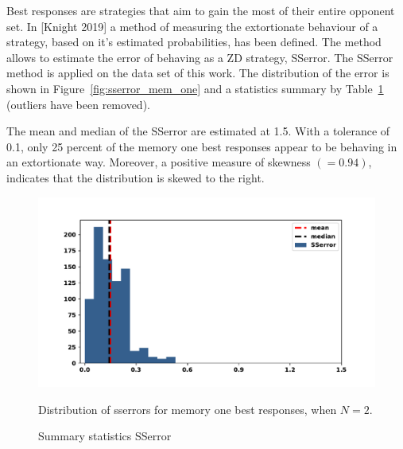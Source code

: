 \documentclass[10pt]{article}
\begin{document}
Best responses are strategies that aim to gain the most of their entire opponent
set. In [Knight 2019] a method of measuring the extortionate behaviour of a
strategy, based on it's estimated probabilities, has been defined. The method
allows to estimate the error of behaving as a ZD strategy, SSerror. The SSerror
method is applied on the data set of this work. The distribution of the error is
shown in Figure~\ref{fig:sserror_mem_one} and a statistics summary by
Table~\ref{table:sserror_stats} (outliers have been removed).

The mean and median of the SSerror are estimated at 1.5. With a tolerance of 0.1,
only 25 percent of the memory one best responses appear to be behaving in an
extortionate way. Moreover, a positive measure of skewness \((=0.94)\), indicates
that the distribution is skewed to the right. 

\begin{figure}
    \begin{minipage}{0.59\textwidth}
            \begin{center}
            \includegraphics[width=\linewidth]{img/best_respones_sserror_remove_outliers.pdf}
            \end{center}
            \caption{Distribution of sserrors for memory one best responses, when \(N=2\).}
            \label{fig:sserror_mem_one}
    \end{minipage}
    \hfill
    \begin{minipage}{0.39\textwidth}
        \centering
        \captionsetup{type=table}
        \resizebox{.4\columnwidth}{!}{%
            }
            \caption{Summary statistics SSerror}
            \label{table:sserror_stats}
      \end{minipage}
\end{figure}
\end{document}
